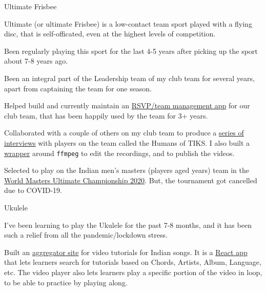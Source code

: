 
\begin{cventries}
  \cventry
      {Ultimate Frisbee}
      {}
      {} %
      {} %
      {
        \begin{cvitems} %
        \item {Ultimate (or ultimate Frisbee) is a low-contact team sport played with a flying disc, that is self-officated, even at the highest levels of competition.}
        \item {Been regularly playing this sport for the last 4-5 years after picking up the sport about 7-8 years ago.}
        \item {Been an integral part of the Leadership team of my club team for several years, apart from captaining the team for one season.}
        \item {Helped build and currently maintain an \href{https://rsvp.thatteidlikaalsoup.team/features}{RSVP/team management app} for our club team, that has been happily used by the team for 3+ years.}
        \item {Collaborated with a couple of others on my club team to produce a \href{https://www.instagram.com/tiks_ultimate/channel/}{series of interviews} with players on the team called the Humans of TIKS. I also built a \href{https://github.com/thatte-idli-kaal-soup/humans}{wrapper} around \texttt{ffmpeg} to edit the recordings, and to publish the videos.}
        \item {Selected to play on the Indian men's masters (players aged  years) team in the \href{https://wmuc2020.com/}{World Masters Ultimate Championship 2020}. But, the tournament got cancelled due to COVID-19.}
        \end{cvitems}
      }
  \cventry
      {Ukulele}
      {}
      {} %
      {} %
      {
        \begin{cvitems} %
        \item {I've been learning to play the Ukulele for the past 7-8 months, and it has been such a relief from all the pandemic/lockdown stress.}
        \item {Built an \href{https://ukulele.muse-amuse.in/}{aggregator site} for video tutorials for Indian songs. It is a \href{https://github.com/punchagan/ukulele-tutorials/}{React app} that lets learners search for tutorials based on Chords, Artists, Album, Language, etc. The video player also lets learners play a specific portion of the video in loop, to be able to practice by playing along.}
        \end{cvitems}
      }
\end{cventries}
